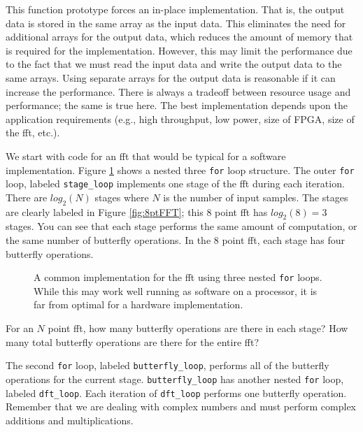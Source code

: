 This function prototype forces an in-place implementation. That is, the output data is stored in the same array as the input data. This eliminates the need for additional arrays for the output data, which reduces the amount of memory that is required for the implementation. However, this may limit the performance due to the fact that we must read the input data and write the output data to the same arrays. Using separate arrays for the output data is reasonable if it can increase the performance. There is always a tradeoff between resource usage and performance; the same is true here. The best implementation depends upon the application requirements (e.g., high throughput, low power, size of FPGA, size of the \gls{fft}, etc.).


We start with code for an \gls{fft} that would be typical for a software implementation. Figure \ref{fig:fft_sw} shows a nested three \lstinline|for| loop structure. The outer \lstinline|for| loop, labeled \lstinline|stage_loop| implements one stage of the \gls{fft} during each iteration. There are $log_2(N)$ stages where $N$ is the number of input samples. The stages are clearly labeled in Figure \ref{fig:8ptFFT}; this 8 point \gls{fft} has $log_2(8) = 3$ stages. You can see that each stage performs the same amount of computation, or the same number of butterfly operations. In the 8 point \gls{fft}, each stage has four butterfly operations. 

\begin{figure}
\begin{tiny}

\end{tiny}
\caption{ A common implementation for the \gls{fft} using three nested \lstinline|for| loops.  While this may work well running as software on a processor, it is far from optimal for a hardware implementation.}
\label{fig:fft_sw}
\end{figure}

\begin{exercise}
For an $N$ point \gls{fft}, how many butterfly operations are there in each stage? How many total butterfly operations are there for the entire \gls{fft}?
\end{exercise}

The second \lstinline|for| loop, labeled \lstinline|butterfly_loop|, performs all of the butterfly operations for the current stage. \lstinline|butterfly_loop| has another nested \lstinline|for| loop, labeled \lstinline|dft_loop|. Each iteration of \lstinline|dft_loop| performs one butterfly operation. Remember that we are dealing with complex numbers and must perform complex additions and multiplications. 

